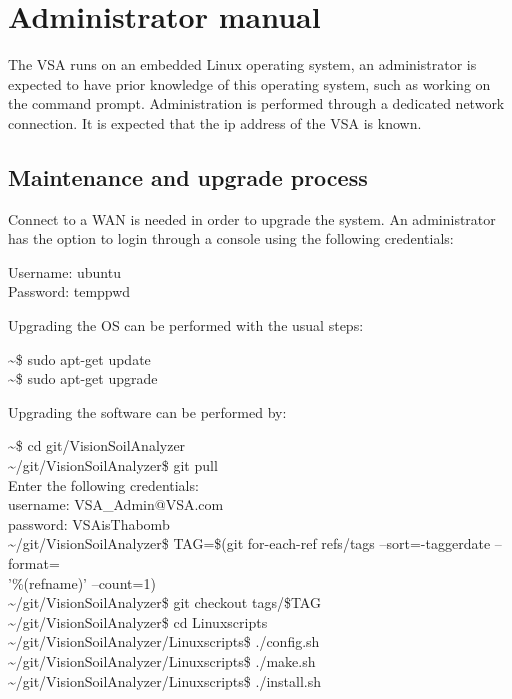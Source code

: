 \documentclass[11pt,fleqn,,a4paper,twoside,openright]{book}
\begin{document}
\section{Administrator manual}
The VSA runs on an embedded Linux operating system, an administrator is expected to have prior knowledge of this operating system, such as working on the command prompt. Administration is performed through a dedicated network connection. It is expected that the ip address of the VSA is known.

\subsection{Maintenance and upgrade process}
Connect to a WAN is needed in order to upgrade the system. An administrator has the option to login through a console using the following credentials:
\begin{sBox}
	Username: ubuntu \\
	Password: temppwd \\
\end{sBox}

Upgrading the OS can be performed with the usual steps:
\begin{sBox}
	\textasciitilde\$ sudo apt-get update \\
	\textasciitilde\$ sudo apt-get upgrade \\
\end{sBox}

Upgrading the software can be performed by:
\begin{sBox}
	\textasciitilde\$ cd git/VisionSoilAnalyzer \\
	\textasciitilde/git/VisionSoilAnalyzer\$ git pull \\
	Enter the following credentials: \\
	username: VSA\_Admin@VSA.com \\
	password: VSAisThabomb \\
	\textasciitilde/git/VisionSoilAnalyzer\$ TAG=\$(git for-each-ref refs/tags --sort=-taggerdate --format=\\
	'\%(refname)' --count=1) \\
	\textasciitilde/git/VisionSoilAnalyzer\$ git checkout tags/\$TAG \\
	\textasciitilde/git/VisionSoilAnalyzer\$ cd Linuxscripts \\
	\textasciitilde/git/VisionSoilAnalyzer/Linuxscripts\$ ./config.sh \\
	\textasciitilde/git/VisionSoilAnalyzer/Linuxscripts\$ ./make.sh \\
	\textasciitilde/git/VisionSoilAnalyzer/Linuxscripts\$ ./install.sh \\
\end{sBox}
\end{document}
